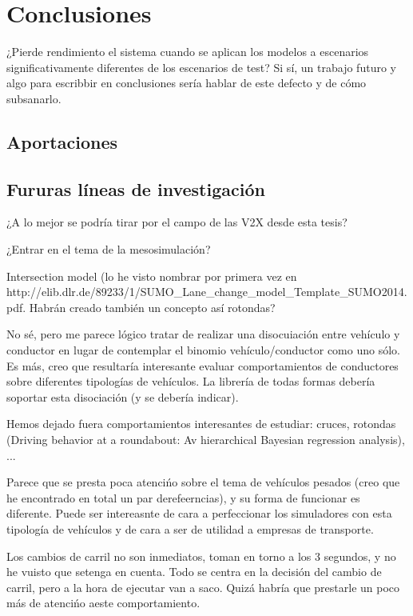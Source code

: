 \chapter{Conclusiones}
\label{ch:conclusions}

¿Pierde rendimiento el sistema cuando se aplican los modelos a escenarios significativamente diferentes de los escenarios de test? Si sí, un trabajo futuro y algo para escribbir en conclusiones sería hablar de este defecto y de cómo subsanarlo.

\section{Aportaciones}
\label{ch:conclusions:contributions}

\section{Fururas líneas de investigación}
\label{ch:conclusions:future-work}

¿A lo mejor se podría tirar por el campo de las V2X desde esta tesis?

¿Entrar en el tema de la mesosimulación?

Intersection model (lo he visto nombrar por primera vez en http://elib.dlr.de/89233/1/SUMO\_Lane\_change\_model\_Template\_SUMO2014.pdf. Habrán creado también un concepto así rotondas?

No sé, pero me parece lógico tratar de realizar una disocuiación entre vehículo y conductor en lugar de contemplar el binomio vehículo/conductor como uno sólo. Es más, creo que resultaría interesante evaluar comportamientos de conductores sobre diferentes tipologías de vehículos. La librería de todas formas debería soportar esta disociación (y se debería indicar).

Hemos dejado fuera comportamientos interesantes de estudiar: cruces, rotondas (Driving behavior at a roundabout: Av hierarchical Bayesian regression analysis), ...

Parece que se presta poca atencińo sobre el tema de vehículos pesados (creo que he encontrado en total un par derefeerncias), y su forma de funcionar es diferente. Puede ser intereasnte de cara a perfeccionar los simuladores con esta tipología de vehículos y de cara a ser de utilidad a empresas de transporte.

Los cambios de carril no son inmediatos, toman en torno a los 3 segundos, y no he vuisto que setenga en cuenta. Todo se centra en la decisión del cambio de carril, pero a la hora de ejecutar van a saco. Quizá habría que prestarle un poco más de atencińo aeste comportamiento.

